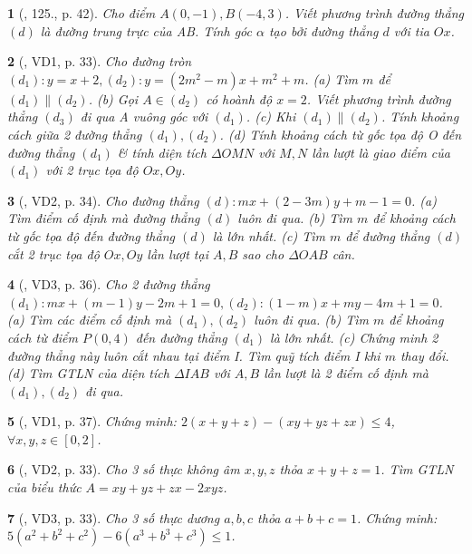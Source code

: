 \documentclass{article}
\newtheorem{baitoan}{}
\begin{document}
\begin{baitoan}[\cite{Tuyen_Toan_9_old}, 125., p. 42]
	Cho điểm $A(0,-1),B(-4,3)$. Viết phương trình đường thẳng $(d)$ là đường trung trực của AB. Tính góc $\alpha$ tạo bởi đường thẳng $d$ với tia $Ox$.
\end{baitoan}

\begin{baitoan}[\cite{Kien_dai_so_9}, VD1, p. 33]
	Cho đường tròn $(d_1):y = x + 2,(d_2):y = (2m^2 - m)x + m^2 + m$. (a) Tìm $m$ để $(d_1)\parallel(d_2)$. (b) Gọi $A\in(d_2)$ có hoành độ $x = 2$. Viết phương trình đường thẳng $(d_3)$ đi qua A vuông góc với $(d_1)$. (c) Khi $(d_1)\parallel(d_2)$. Tính khoảng cách giữa 2 đường thẳng $(d_1),(d_2)$. (d) Tính khoảng cách từ gốc tọa độ O đến đường thẳng $(d_1)$ \& tính diện tích $\Delta OMN$ với $M,N$ lần lượt là giao điểm của $(d_1)$ với 2 trục tọa độ $Ox,Oy$.
\end{baitoan}

\begin{baitoan}[\cite{Kien_dai_so_9}, VD2, p. 34]
	Cho đường thẳng $(d):mx + (2 - 3m)y + m - 1 = 0$. (a) Tìm điểm cố định mà đường thẳng $(d)$ luôn đi qua. (b) Tìm $m$ để khoảng cách từ gốc tọa độ đến đường thẳng $(d)$ là lớn nhất. (c) Tìm $m$ để đường thẳng $(d)$ cắt 2 trục tọa độ $Ox,Oy$ lần lượt tại $A,B$ sao cho $\Delta OAB$ cân.
\end{baitoan}

\begin{baitoan}[\cite{Kien_dai_so_9}, VD3, p. 36]
	Cho 2 đường thẳng $(d_1):mx + (m - 1)y - 2m + 1 = 0,(d_2):(1 - m)x + my - 4m + 1 = 0$. (a) Tìm các điểm cố định mà $(d_1),(d_2)$ luôn đi qua. (b) Tìm $m$ để khoảng cách từ điểm $P(0,4)$ đến đường thẳng $(d_1)$ là lớn nhất. (c) Chứng minh 2 đường thẳng này luôn cắt nhau tại điểm I. Tìm quỹ tích điểm I khi $m$ thay đổi. (d) Tìm {\rm GTLN} của diện tích $\Delta IAB$ với $A,B$ lần lượt là 2 điểm cố định mà $(d_1),(d_2)$ đi qua.
\end{baitoan}

\begin{baitoan}[\cite{Kien_dai_so_9}, VD1, p. 37]
	Chứng minh: $2(x + y + z) - (xy + yz + zx)\le4$, $\forall x,y,z\in[0,2]$.
\end{baitoan}

\begin{baitoan}[\cite{Kien_dai_so_9}, VD2, p. 33]
	Cho 3 số thực không âm $x,y,z$ thỏa $x + y + z = 1$. Tìm {\rm GTLN} của biểu thức $A = xy + yz + zx - 2xyz$.
\end{baitoan}

\begin{baitoan}[\cite{Kien_dai_so_9}, VD3, p. 33]
	Cho 3 số thực dương $a,b,c$ thỏa $a + b + c = 1$. Chứng minh: $5(a^2 + b^2 + c^2) - 6(a^3 + b^3 + c^3)\le1$.
\end{baitoan}


\printbibliography[heading=bibintoc]
	
\end{document}
